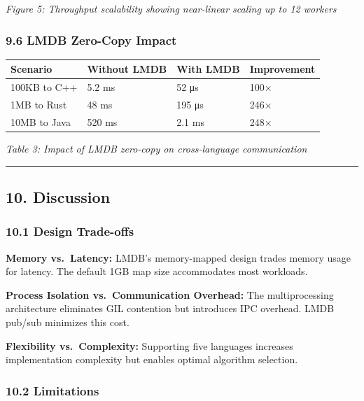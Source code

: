 \documentclass[
]{article}
\begin{document}
\emph{Figure 5: Throughput scalability showing near-linear scaling up to
12 workers}

\hypertarget{lmdb-zero-copy-impact}{%
\subsubsection{9.6 LMDB Zero-Copy Impact}\label{lmdb-zero-copy-impact}}

\begin{longtable}[]{@{}llll@{}}
\toprule\noalign{}
Scenario & Without LMDB & With LMDB & Improvement \\
\midrule\noalign{}
\endhead
\bottomrule\noalign{}
\endlastfoot
100KB to C++ & 5.2 ms & 52 μs & 100× \\
1MB to Rust & 48 ms & 195 μs & 246× \\
10MB to Java & 520 ms & 2.1 ms & 248× \\
\end{longtable}

\emph{Table 3: Impact of LMDB zero-copy on cross-language communication}

\begin{center}\rule{0.5\linewidth}{0.5pt}\end{center}

\hypertarget{discussion}{%
\subsection{10. Discussion}\label{discussion}}

\hypertarget{design-trade-offs}{%
\subsubsection{10.1 Design Trade-offs}\label{design-trade-offs}}

\textbf{Memory vs.~Latency:} LMDB's memory-mapped design trades memory
usage for latency. The default 1GB map size accommodates most workloads.

\textbf{Process Isolation vs.~Communication Overhead:} The
multiprocessing architecture eliminates GIL contention but introduces
IPC overhead. LMDB pub/sub minimizes this cost.

\textbf{Flexibility vs.~Complexity:} Supporting five languages increases
implementation complexity but enables optimal algorithm selection.

\hypertarget{limitations}{%
\subsubsection{10.2 Limitations}\label{limitations}}
\end{document}
